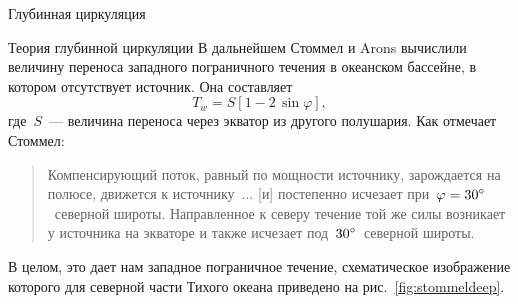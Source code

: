\begin{chapter}{Глубинная циркуляция}
\begin{section}{Теория глубинной циркуляции}
В дальнейшем Стоммел и Arons вычислили величину 
переноса западного пограничного
течения в океанском бассейне, в котором отсутствует источник. 
Она составляет
\begin{equation}
 T_w = S \left[ 1 - 2 \, \sin \varphi \right],
\end{equation}
где~$S$~--- величина переноса через экватор
из другого полушария. Как отмечает Стоммел:
\begin{quote}
Компенсирующий поток, равный по мощности источнику, зарождается 
на полюсе, движется к источнику~$\ldots$ [и] постепенно исчезает 
при~$\varphi = {30}^\circ$~северной широты. 
Направленное к северу течение той же силы возникает 
у источника на экваторе
и также исчезает под~${30}^\circ$~северной широты.
\end{quote}
В целом, это дает нам западное пограничное течение, схематическое изображение
которого для северной части Тихого океана приведено 
на рис.~\ref{fig:stommeldeep}.
%


\end{section}
\end{chapter}

